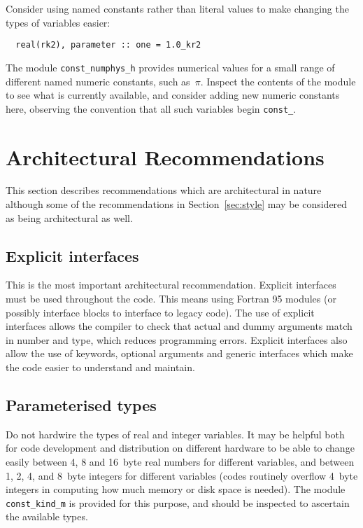 \documentclass[11pt,twoside,a4paper]{report}
\newcommand{\T}[1]{{\tt #1}}
\begin{document}
Consider using named constants rather than literal values to make
changing the types of variables easier:
\begin{verbatim}
  real(rk2), parameter :: one = 1.0_kr2
\end{verbatim}
The module \verb|const_numphys_h| provides numerical values for a small
range of different named numeric constants, such as~$\pi$.
Inspect the contents of the module to see what is currently available,
and consider adding new numeric constants here, observing the
convention that all such variables begin \verb|const_|.

\chapter{Architectural Recommendations}
\label{sec:arch}

This section describes recommendations which are architectural in nature
although some of the recommendations in Section~\ref{sec:style} may be
considered as being architectural as well.


\section{Explicit interfaces}

This is the most important architectural recommendation. 
Explicit interfaces must be used throughout the code.
This means using Fortran 95 modules (or possibly interface blocks
to interface to legacy code). The use of explicit interfaces
allows the compiler to check that actual and dummy arguments
match in number and type, which reduces programming errors.
Explicit interfaces also allow the use of keywords, optional arguments
and generic interfaces which make the code easier to understand and
maintain.

\section{Parameterised types}

Do not hardwire the types of real and integer variables.
It may be helpful both for code development and distribution
on different hardware to be able to change easily between 4, 8
and 16~byte real numbers for
different variables, and between 1, 2, 4, and 8~byte integers for
different variables (codes routinely overflow 4~byte
integers in computing how much memory or disk space is needed).
The module \T{const\_kind\_m} is provided for this purpose,
and should be inspected to ascertain the available types.
\end{document}
